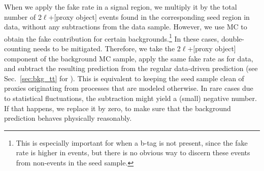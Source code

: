 When we apply the fake rate in a signal region, we multiply it by the total number of 2$\ell$+[proxy object] events found in the corresponding seed region in data, without any subtractions from the data sample. However, we use MC to obtain the fake contribution for certain backgrounds.\footnote{This is especially important for \ttbar when a b-tag is not present, since the fake rate is higher in \ttbar events, but there is no obvious way to discern these events from non-\ttbar events in the seed sample.} In these cases, double-counting needs to be mitigated. Therefore, we take the 2$\ell$+[proxy object] component of the background MC sample, apply the same fake rate as for data, and subtract the resulting prediction from the regular data-driven prediction (see \eg Sec.~\ref{sec:bkg_tt} for \ttbar). This is equivalent to keeping the seed sample clean of proxies originating from processes that are modeled otherwise. In rare cases due to statistical fluctuations, the subtraction might yield a (small) negative number. If that happens, we replace it by zero, to make sure that the background prediction behaves physically reasonably.


